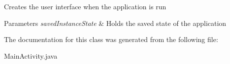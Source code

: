 Creates the user interface when the application is run 
\begin{DoxyParams}{Parameters}
{\em saved\+Instance\+State} & Holds the saved state of the application \\
\hline
\end{DoxyParams}


The documentation for this class was generated from the following file\+:\begin{DoxyCompactItemize}
\item 
Main\+Activity.\+java\end{DoxyCompactItemize}

